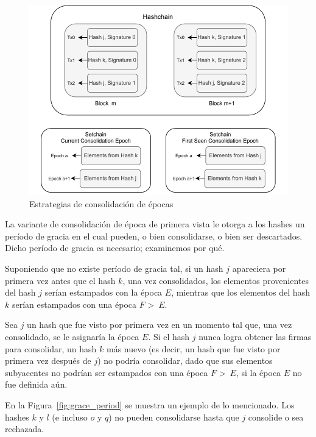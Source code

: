 \begin{figure}
  \centering
  \includegraphics[scale=0.7]{figures/consolidation_epoch.pdf}
  \caption{Estrategias de consolidación de épocas}
  \label{fig:consolidation_epoch}
\end{figure}

La variante de consolidación de época de primera vista le otorga a los hashes un período
de gracia en el cual pueden, o bien consolidarse, o bien ser descartados.
%
Dicho período de gracia es necesario; examinemos por qué.


Suponiendo que no existe período de gracia tal, si un hash $j$ apareciera por primera vez
antes que el hash $k$, una vez consolidados, los elementos provenientes del hash $j$
serían estampados con la época $E$, mientras que los elementos del hash $k$ serían estampados
con una época $F$ \textgreater \ $E$.
%

Sea $j$ un hash que fue visto por primera vez en un momento tal que, una vez consolidado,
se le asignaría la época $E$.
%
Si el hash $j$ nunca logra obtener las \SPH firmas para
consolidar, un hash $k$ más nuevo (es decir, un hash que fue visto por primera vez
después de $j$) no podría consolidar, dado que sus elementos subyacentes no podrían ser
estampados con una época $F$ \textgreater \ $E$, si la época $E$ no fue definida aún.
%

En la Figura~\ref{fig:grace_period} se muestra un ejemplo de lo mencionado. Los hashes
$k$ y $l$ (e incluso $o$ y $q$) no pueden consolidarse hasta que $j$ consolide o sea rechazada.

